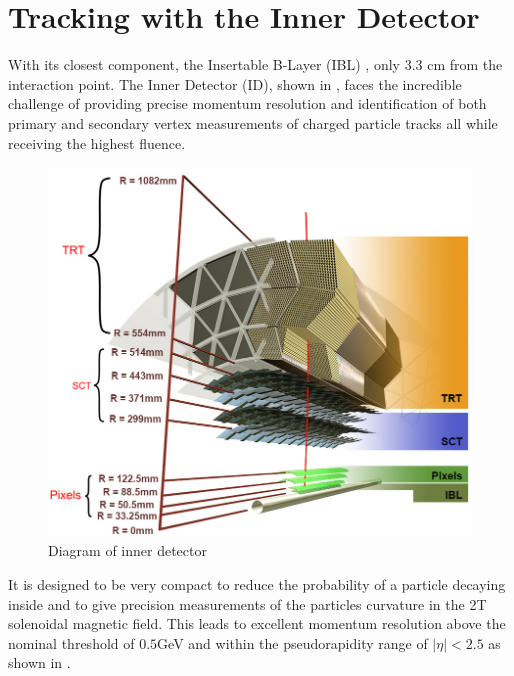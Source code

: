 \section{Tracking with the Inner Detector} \label{sec:atlas:tracking}

With its closest component, the Insertable B-Layer (IBL)
\cite{Potamianos:2209070}, only 3.3 cm from the interaction point. The Inner
Detector (ID), shown in 
\cite{ATLAS-TDR-4,ATLAS-TDR-5}, faces the incredible challenge of providing
precise momentum resolution and identification of both primary and secondary
vertex measurements of charged particle tracks all while receiving the highest fluence.

\begin{figure}[!htbp]
  \begin{center}
    \includegraphics[width=0.8\linewidth]{figures/atlas/inner_detector_diagram}
    \caption{ \cite{Potamianos:2209070} Diagram of inner detector}
    \label{fig:inner_detector_diagram}
  \end{center}
\end{figure}

It is designed to be very compact to reduce the probability of a particle
decaying inside and to give precision measurements of the particles curvature in
the 2T solenoidal magnetic field. This leads to excellent momentum resolution
above the nominal \pT threshold of $0.5$GeV and within the pseudorapidity range
of $|\eta| < 2.5$ as shown in .

